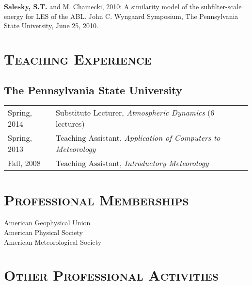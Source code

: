 \documentclass[11pt,letterpaper]{article}
\begin{document}
\textbf{Salesky, S.T.} and M. Chamecki, 2010: A similarity model of the
subfilter-scale energy for LES of the ABL. John C. Wyngaard Symposium, The
Pennsylvania State University, June 25, 2010. 

\section*{\textsc{Teaching Experience}} 
\subsection*{The Pennsylvania State University}

\begin{tabular}{l l}
Spring, 2014 & Substitute Lecturer, \textit{Atmospheric Dynamics} (6 lectures) \\
Spring, 2013 & Teaching Assistant, \textit{Application of Computers to Meteorology} \\
Fall, 2008 & Teaching Assistant, \textit{Introductory Meteorology} \\
\end{tabular}


\section*{\textsc{Professional Memberships}} 

American Geophysical Union \\
American Physical Society \\
American Meteorological Society 


\section*{\textsc{Other Professional Activities}} 
\end{document}
